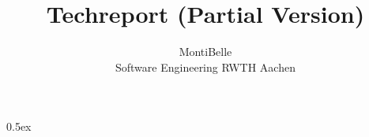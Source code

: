 \documentclass[11pt,a4paper]{article}
\begin{document}
\title{Techreport (Partial Version)}
\author{MontiBelle \\ Software Engineering RWTH Aachen}
\maketitle

\tableofcontents

\parindent 0pt\parskip 0.5ex



\printglossary
\end{document}
